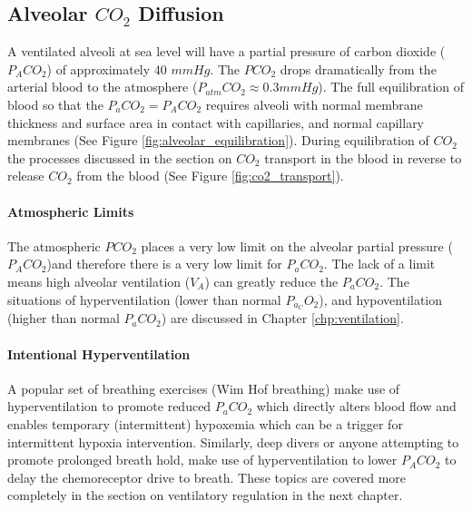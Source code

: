 
\subsection{Alveolar $CO_2$ Diffusion}

A ventilated alveoli at sea level will have a partial pressure of carbon dioxide ($P_ACO_2$) of approximately 40 $mmHg$. The $PCO_2$ drops dramatically from the arterial blood to the atmosphere ($P_{atm}CO_2 \approx 0.3 mmHg$). The full equilibration of blood so that the $P_aCO_2 = P_ACO_2$ requires alveoli with normal membrane thickness and surface area in contact with capillaries, and normal capillary membranes (See Figure \ref{fig:alveolar_equilibration}). During equilibration of $CO_2$ the processes discussed in the section on $CO_2$ transport in the blood in reverse to release $CO_2$ from the blood (See Figure \ref{fig:co2_transport}). 

\paragraph{Atmospheric Limits}

The atmospheric $PCO_2$ places a very low limit on the alveolar partial pressure ($P_ACO_2$)and therefore there is a very low limit for $P_aCO_2$. The lack of a limit means high alveolar ventilation ($V_A$) can greatly reduce the $P_aCO_2$. The situations of hyperventilation (lower than normal $P_a_CO_2$), and hypoventilation (higher than normal $P_aCO_2$) are discussed in Chapter \ref{chp:ventilation}. 

\paragraph{Intentional Hyperventilation}
A popular set of breathing exercises (Wim Hof breathing) make use of hyperventilation to promote reduced $P_aCO_2$ which directly alters blood flow and enables temporary (intermittent) hypoxemia which can be a trigger for intermittent hypoxia intervention. Similarly, deep divers or anyone attempting to promote prolonged breath hold, make use of hyperventilation to lower $P_ACO_2$ to delay the chemoreceptor drive to breath. These topics are covered more completely in the section on ventilatory regulation in the next chapter.

